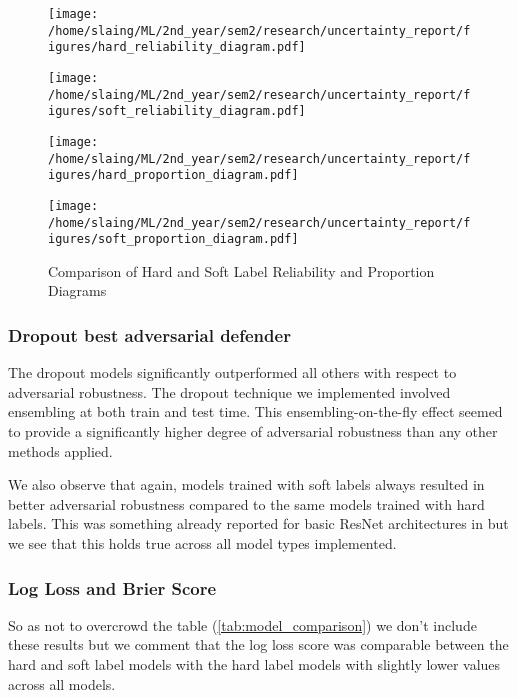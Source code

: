 \documentclass{article}
\begin{document}
\begin{figure}[ht]
    \centering
    \begin{minipage}{0.45\linewidth}
        \centering
        \texttt{[image: /home/slaing/ML/2nd\_year/sem2/research/uncertainty\_report/figures/hard\_reliability\_diagram.pdf]}
    \end{minipage}
    \hfill
    \begin{minipage}{0.45\linewidth}
        \centering
        \texttt{[image: /home/slaing/ML/2nd\_year/sem2/research/uncertainty\_report/figures/soft\_reliability\_diagram.pdf]}
    \end{minipage}
    \vfill
    \begin{minipage}{0.45\linewidth}
        \centering
        \texttt{[image: /home/slaing/ML/2nd\_year/sem2/research/uncertainty\_report/figures/hard\_proportion\_diagram.pdf]}
    \end{minipage}
    \hfill
    \begin{minipage}{0.45\linewidth}
        \centering
        \texttt{[image: /home/slaing/ML/2nd\_year/sem2/research/uncertainty\_report/figures/soft\_proportion\_diagram.pdf]}
    \end{minipage}
    \caption{Comparison of Hard and Soft Label Reliability and Proportion Diagrams}
    \label{fig:2x2grid}
\end{figure}


\subsubsection*{Dropout best adversarial defender }
The dropout models significantly outperformed all others with respect to adversarial robustness. The dropout technique we implemented involved ensembling at both train and test time. This ensembling-on-the-fly effect seemed to provide a significantly higher degree of adversarial robustness than any other methods applied. 

We also observe that again, models trained with soft labels always resulted in better adversarial robustness compared to the same models trained with hard labels. This was something already reported for basic ResNet architectures in \cite{peterson2019humanuncertaintymakesclassification} but we see that this holds true across all model types implemented. 
 
\subsubsection*{Log Loss and Brier Score}
So as not to overcrowd the table (\autoref{tab:model_comparison}) we don't include these results but we comment that the log loss score was comparable between the hard and soft label models with the hard label models with slightly lower values across all models. 
\end{document}

